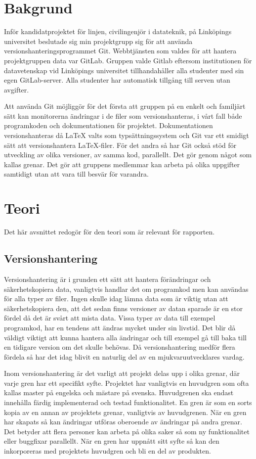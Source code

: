 \clearpage
\section{Bakgrund}
Inför kandidatprojektet för linjen, civilingenjör i datateknik, på Linköpings universitet beslutade sig min projektgrupp sig för att använda versionshanteringsprogrammet Git.
Webbtjänsten som valdes för att hantera projektgruppen data var GitLab. Gruppen valde Gitlab eftersom institutionen för datavetenskap vid Linköpings universitet tillhandahåller alla studenter med sin egen GitLab-server. Alla studenter har automatisk tillgång till serven utan avgifter.

Att använda Git möjliggör för det första att gruppen på en enkelt och familjärt sätt kan monitorerna ändringar i de filer som versionshanteras, i vårt fall både programkoden och dokumentationen för projektet. Dokumentationen versionshanteras då LaTeX valts som typsättningssystem och Git var ett smidigt sätt att versionshantera LaTeX-filer. För det andra så har Git också stöd för utveckling av olika versioner, av samma kod, parallellt. Det gör genom något som kallas grenar. Det gör att gruppens medlemmar kan arbeta på olika uppgifter samtidigt utan att vara till besvär för varandra.


\section{Teori}
Det här avsnittet redogör för den teori som är relevant för rapporten.
\subsection{Versionshantering}
Versionshantering är i grunden ett sätt att hantera förändringar och säkerhetskopiera data, vanligtvis handlar det om programkod men kan användas för alla typer av filer. Ingen skulle idag lämna data som är viktig utan att säkerhetskopiera den, att det sedan finns versioner av datan sparade är en stor fördel då det är svårt att mista data. Vissa typer av data till exempel programkod, har en tendens att ändras mycket under sin livstid. Det blir då väldigt viktigt att kunna hantera alla ändringar och till exempel gå till baka till en tidigare version om det skulle behövas. Då versionshantering medför flera fördela så har det idag blivit en naturlig del av en mjukvaruutvecklares vardag.\cite{VersionControlGit}

Inom versionshantering är det varligt att projekt delas upp i olika grenar, där varje gren har ett specifikt syfte. Projektet har vanligtvis en huvudgren som ofta kallas master på engelska och mästare på svenska. Huvudgrenen ska endast innehålla färdig implementerad och testad funktionalitet.
En gren är som en sorts kopia av en annan av projektets grenar, vanligtvis av huvudgrenen. När en gren har skapats så kan ändringar utföras oberoende av ändringar på andra grenar. Det betyder att flera personer kan arbeta på olika saker så som ny funktionalitet eller buggfixar parallellt. När en gren har uppnått sitt syfte så kan den inkorporeras med projektets huvudgren och bli en del av produkten.

